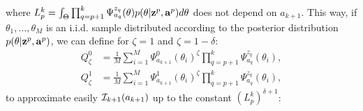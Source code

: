 where $L^k_p = \int_\Theta \prod_{q=p+1}^k\Psi^{z_{q}}_{a_{q}}(\theta)p(\theta|\mathbf{z}^p,\mathbf{a}^p)d\theta$ does not depend on $a_{k+1}$.
%
This way, if $\theta_1,\dots,\theta_M$ is an i.i.d. sample distributed according to the posterior distribution $p(\theta|\mathbf{z}^p,\mathbf{a}^p)$, we can define for $\zeta=1$ and $\zeta=1-\delta$:
    \begin{align}
        Q_\zeta^0 &= \frac{1}{M}\sum_{i=1}^M\Psi^{0}_{a_{k+1}}(\theta_i)^{\zeta}\prod_{q=p+1}^k\Psi^{z_{q}}_{a_{q}}(\theta_i), \\
        Q_\zeta^1 &= \frac{1}{M}\sum_{i=1}^M\Psi^{1}_{a_{k+1}}(\theta_i)^{\zeta}\prod_{q=p+1}^k\Psi^{z_{q}}_{a_{q}}(\theta_i),\nonumber
    \end{align}
to approximate easily  $\mathcal{I}_{k+1}(a_{k+1})$ up to the constant $(L^k_p)^{\delta+1}$:
